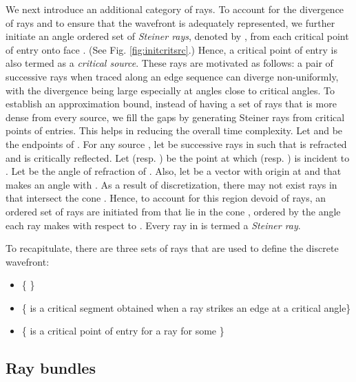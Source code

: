 \documentclass[11pt]{article}
\begin{document}
We next introduce an additional category of rays. To account for the divergence of rays and to ensure that
the wavefront is adequately represented, we further initiate an angle ordered set of {\it Steiner rays}, denoted by , from each critical point of entry  onto face . 
(See Fig. \ref{fig:initcritsrc}.)
Hence, a critical point of entry is also termed as a {\it critical source}.
These rays are motivated as follows: a pair of successive rays when traced along an edge sequence can diverge non-uniformly, with the divergence being large especially at angles close to critical angles.
To establish an approximation bound, instead of having a set of rays that is more dense from every source, we fill the gaps by generating Steiner rays from critical points of entries.
This helps in reducing the overall time complexity.
Let  and  be the endpoints of .
For any source , let  be successive rays in  such that  is refracted and  is critically reflected.
Let  (resp. ) be the point at which  (resp. ) is incident to .
Let  be the angle of refraction of .
Also, let  be a vector with origin at  and that makes an angle  with . 
As a result of discretization, there may not exist rays in  that intersect the cone .
Hence, to account for this region devoid of rays, an ordered set  of rays are initiated from  that lie in the cone , ordered by the angle each ray makes with respect to . 
Every ray in  is termed a {\it Steiner ray}.

To recapitulate, there are three sets  of rays that are used to define the discrete wavefront:
\begin{itemize}
\item \{ \hspace{0.005in}  \hspace{0.005in} \}
\item \{ \hspace{0.005in}  \hspace{0.005in}  is a critical segment obtained  when a ray   strikes an edge  at a critical angle\} 
\item \{ \hspace{0.005in}  \hspace{0.005in}  is a critical point of entry for a ray  for some \}
\end{itemize}


\subsection{Ray bundles}
\end{document}
